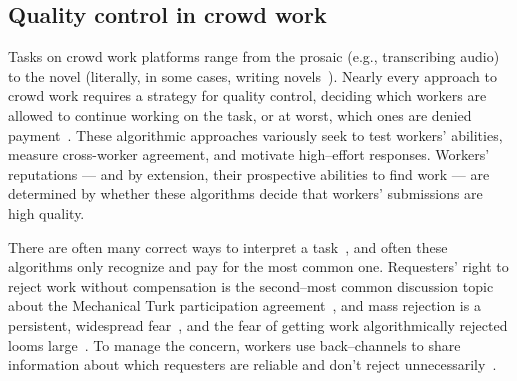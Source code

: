 \documentclass[main]{subfiles}
\begin{document}
\subsection{Quality control in crowd work}\label{sec:crowdwork}

Tasks on crowd work platforms range from the prosaic
(e.g., transcribing audio)
to the novel
(literally, in some cases, writing novels~\cite{Kim2017}).
Nearly every approach to crowd work requires a strategy for quality control,
deciding which workers are allowed to continue working on the task,
or at worst,
which ones are denied payment~\cite{Bigham2014,Sheng:2008:GLI:1401890.1401965,mitraComparingStrategies,incentivesShaw}.
These algorithmic approaches variously seek to
test workers' abilities,
measure cross-worker agreement, and
motivate high--effort responses.
Workers' reputations
--- and by extension, their prospective abilities to find work ---
are determined by whether these algorithms decide that workers' submissions are high quality.

There are often many correct ways to interpret a task~\cite{kairam2016parting}, and
often these algorithms only recognize and pay for the most common one.
Requesters' right to reject work without compensation is
the second--most common discussion topic about the Mechanical Turk participation agreement~\cite{takingAHITMcInnis}, and
mass rejection is a persistent, widespread fear~\cite{martin2014being}, and
the fear of getting work algorithmically rejected looms large~\cite{takingAHITMcInnis}.
To manage the concern, workers use back--channels
to share information about which requesters are reliable and don't reject unnecessarily~\cite{crowdcollab,turkopticon}.
\end{document}
